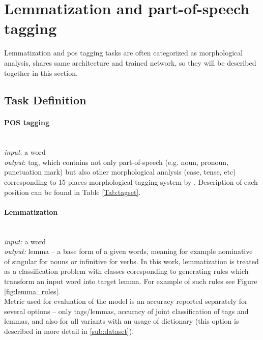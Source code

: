 \section{Lemmatization and part-of-speech tagging}
\label{chap:tag}
Lemmatization and \acrlong{pos} tagging tasks are often categorized as morphological analysis, shares same architecture and trained network, so they will be described together in this section.
\subsection{Task Definition}

\paragraph{\textbf{POS tagging}} \mbox{}\\
\textit{input}: a word \\
\textit{output}: tag, which contains not only part-of-speech (e.g. noun, pronoun, punctuation mark) but also other morphological analysis (case, tense, etc) corresponding to 15-places morphological tagging system by \cite{Hajic2004}. Description of each position can be found in Table \ref{Tab:tagset}.

\paragraph{\textbf{Lemmatization}} \mbox{}\\
\textit{input:} a word \\
\textit{output:} lemma -- a base form of a given words, meaning for example nominative of singular for nouns or infinitive for verbs. In this work, lemmatization is treated as a classification problem with classes coresponding to generating rules which transform an input word into target lemma. For example of such rules see Figure \ref{fig:lemma_rules}. \\


Metric used for evaluation of the model is an accuracy reported separately for several options -- only tags/lemmas, accuracy of joint classification of tags and lemmas, and  also for all variants with an usage of dictionary (this option is described in more detail in \ref{sub:dataset}).

